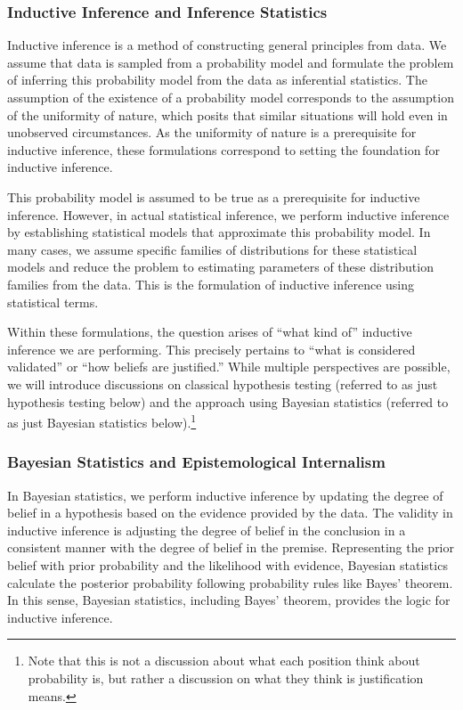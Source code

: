 \documentclass{book}
\begin{document}
\subsubsection{Inductive Inference and Inference Statistics}

Inductive inference is a method of constructing general principles from data. We assume that data is sampled from a probability model and formulate the problem of inferring this probability model from the data as inferential statistics. The assumption of the existence of a probability model corresponds to the assumption of the uniformity of nature, which posits that similar situations will hold even in unobserved circumstances. As the uniformity of nature is a prerequisite for inductive inference, these formulations correspond to setting the foundation for inductive inference.

This probability model is assumed to be true as a prerequisite for inductive inference. However, in actual statistical inference, we perform inductive inference by establishing statistical models that approximate this probability model. In many cases, we assume specific families of distributions for these statistical models and reduce the problem to estimating parameters of these distribution families from the data. This is the formulation of inductive inference using statistical terms.

Within these formulations, the question arises of ``what kind of'' inductive inference we are performing. This precisely pertains to ``what is considered validated'' or ``how beliefs are justified.'' While multiple perspectives are possible, we will introduce discussions on classical hypothesis testing (referred to as just hypothesis testing below) and the approach using Bayesian statistics (referred to as just Bayesian statistics below).\footnote{
Note that this is not a discussion about what each position think about probability is, but rather a discussion on what they think is justification means.
}

\subsubsection{Bayesian Statistics and Epistemological Internalism}
In Bayesian statistics, we perform inductive inference by updating the degree of belief in a hypothesis based on the evidence provided by the data. The validity in inductive inference is adjusting the degree of belief in the conclusion in a consistent manner with the degree of belief in the premise. Representing the prior belief with prior probability and the likelihood with evidence, Bayesian statistics calculate the posterior probability following probability rules like Bayes' theorem. In this sense, Bayesian statistics, including Bayes' theorem, provides the logic for inductive inference. 
\end{document}
